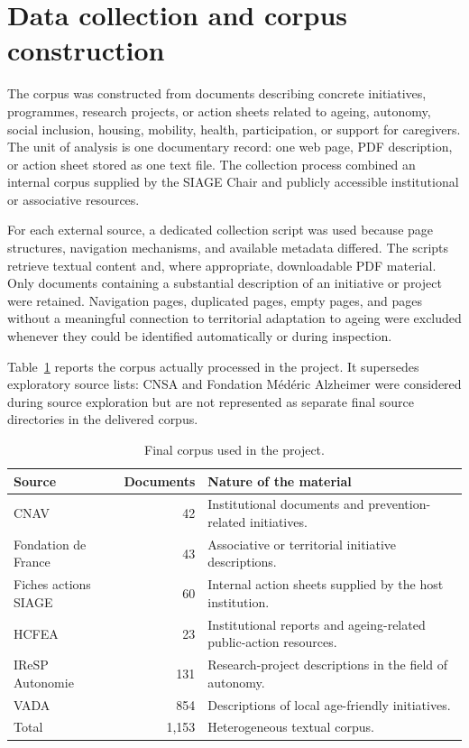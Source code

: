 \section{Data collection and corpus construction}

The corpus was constructed from documents describing concrete initiatives,
programmes, research projects, or action sheets related to ageing, autonomy,
social inclusion, housing, mobility, health, participation, or support for
caregivers. The unit of analysis is one documentary record: one web page, PDF
description, or action sheet stored as one text file. The collection process
combined an internal corpus supplied by the SIAGE Chair and publicly accessible
institutional or associative resources.

For each external source, a dedicated collection script was used because page
structures, navigation mechanisms, and available metadata differed. The scripts
retrieve textual content and, where appropriate, downloadable PDF material.
Only documents containing a substantial description of an initiative or project
were retained. Navigation pages, duplicated pages, empty pages, and pages
without a meaningful connection to territorial adaptation to ageing were
excluded whenever they could be identified automatically or during inspection.

Table~\ref{tab:final-corpus} reports the corpus actually processed in the
project. It supersedes exploratory source lists: CNSA and Fondation Médéric
Alzheimer were considered during source exploration but are not represented as
separate final source directories in the delivered corpus.

\begin{table}[H]
\centering
\begin{tabular}{lrp{7cm}}
\toprule
Source & Documents & Nature of the material \\
\midrule
CNAV & 42 & Institutional documents and prevention-related initiatives. \\
Fondation de France & 43 & Associative or territorial initiative descriptions. \\
Fiches actions SIAGE & 60 & Internal action sheets supplied by the host institution. \\
HCFEA & 23 & Institutional reports and ageing-related public-action resources. \\
IReSP Autonomie & 131 & Research-project descriptions in the field of autonomy. \\
VADA & 854 & Descriptions of local age-friendly initiatives. \\
\midrule
Total & 1,153 & Heterogeneous textual corpus. \\
\bottomrule
\end{tabular}
\caption{Final corpus used in the project.}
\label{tab:final-corpus}
\end{table}

